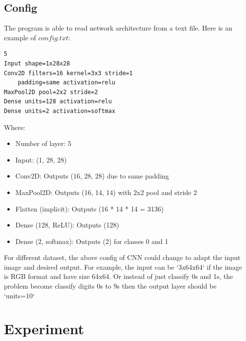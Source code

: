 \documentclass[journal]{IEEEtran} %
\begin{document}
\subsection{Config}
The program is able to read network architecture from a text file. Here is an example of \(config.txt\):
\begin{verbatim}
5
Input shape=1x28x28
Conv2D filters=16 kernel=3x3 stride=1 
    padding=same activation=relu
MaxPool2D pool=2x2 stride=2
Dense units=128 activation=relu
Dense units=2 activation=softmax
\end{verbatim}
Where:
\begin{itemize}
    \item Number of layer: 5
    \item Input: (1, 28, 28)
    \item Conv2D: Outputs (16, 28, 28) due to same padding
    \item MaxPool2D: Outputs (16, 14, 14) with 2x2 pool and stride 2
    \item Flatten (implicit): Outputs (16 * 14 * 14 = 3136)
    \item Dense (128, ReLU): Outputs (128)
    \item Dense (2, softmax): Outputs (2) for classes 0 and 1
\end{itemize}

For different dataset, the above config of CNN could change to adapt the input image and desired output. For example, the input can be `3x64x64` if the image is RGB format and have size 64x64. Or instead of just classify 0s and 1s, the problem become classify digits 0s to 9s then the output layer should be `units=10`

\section{Experiment}
\end{document}
